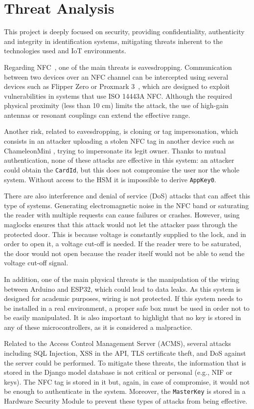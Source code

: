 \section{Threat Analysis}
\label{sec:threat_analysis}

This project is deeply focused on security, providing confidentiality, authenticity and integrity in identification systems, mitigating threats inherent to the technologies used and IoT environments.

Regarding NFC~\cite{Ref54}, one of the main threats is eavesdropping. Communication between two devices over an NFC channel can be intercepted using several devices such as Flipper Zero or Proxmark 3~\cite{Ref55}, which are designed to exploit vulnerabilities in systems that use ISO 14443A NFC. Although the required physical proximity (less than 10 cm) limits the attack, the use of high-gain antennas or resonant couplings can extend the effective range.

Another risk, related to eavesdropping, is cloning or tag impersonation, which consists in an attacker uploading a stolen NFC tag in another device such as ChameleonMini \cite{Ref57}, trying to impersonate its legit owner. Thanks to mutual authentication, none of these attacks are effective in this system: an attacker could obtain the \texttt{CardId}, but this does not compromise the user nor the whole system. Without access to the HSM it is impossible to derive \texttt{AppKey0}.

There are also interference and denial of service (DoS) attacks that can affect this type of systems. Generating electromagnetic noise in the NFC band or saturating the reader with multiple requests can cause failures or crashes. However, using maglocks ensures that this attack would not let the attacker pass through the protected door. This is because voltage is constantly supplied to the lock, and in order to open it, a voltage cut-off is needed. If the reader were to be saturated, the door would not open because the reader itself would not be able to send the voltage cut-off signal.

In addition, one of the main physical threats is the manipulation of the wiring between Arduino and ESP32, which could lead to data leaks. As this system is designed for academic purposes, wiring is not protected. If this system needs to be installed in a real environment, a proper safe box must be used in order not to be easily manipulated. It is also important to highlight that no key is stored in any of these microcontrollers, as it is considered a malpractice.

Related to the Access Control Management Server (ACMS), several attacks including SQL Injection, XSS in the API, TLS certificate theft, and DoS against the server could be performed. To mitigate these threats, the information that is stored in the Django model database is not critical or personal (e.g., NIF or keys). The NFC tag is stored in it but, again, in case of compromise, it would not be enough to authenticate in the system. Moreover, the \texttt{MasterKey} is stored in a Hardware Security Module to prevent these types of attacks from being effective.

